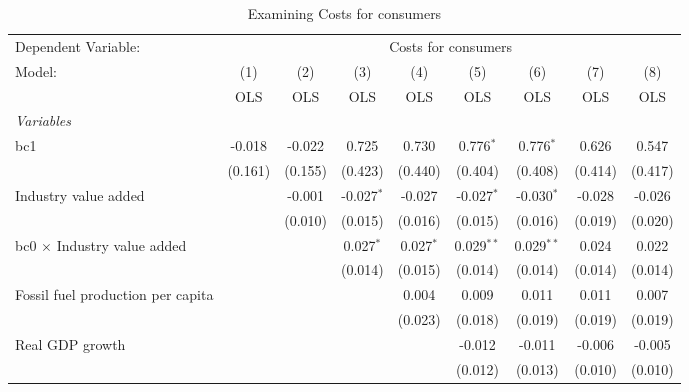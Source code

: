 
\begin{table}[htbp]
   \caption{Examining Costs for consumers}
   \centering
   \begin{tabular}{lcccccccc}
      \toprule
      Dependent Variable: & \multicolumn{8}{c}{Costs for consumers}\\
      Model:                                  & (1)     & (2)     & (3)          & (4)         & (5)          & (6)          & (7)     & (8)\\  
                                              &  OLS    & OLS     & OLS          & OLS         & OLS          & OLS          & OLS     & OLS\\  
      \midrule
      \emph{Variables}\\
      bc1                                     & -0.018  & -0.022  & 0.725        & 0.730       & 0.776$^{*}$  & 0.776$^{*}$  & 0.626   & 0.547\\   
                                              & (0.161) & (0.155) & (0.423)      & (0.440)     & (0.404)      & (0.408)      & (0.414) & (0.417)\\   
      Industry value added                    &         & -0.001  & -0.027$^{*}$ & -0.027      & -0.027$^{*}$ & -0.030$^{*}$ & -0.028  & -0.026\\   
                                              &         & (0.010) & (0.015)      & (0.016)     & (0.015)      & (0.016)      & (0.019) & (0.020)\\   
      bc0 $\times$ Industry value added       &         &         & 0.027$^{*}$  & 0.027$^{*}$ & 0.029$^{**}$ & 0.029$^{**}$ & 0.024   & 0.022\\   
                                              &         &         & (0.014)      & (0.015)     & (0.014)      & (0.014)      & (0.014) & (0.014)\\   
      Fossil fuel production per capita       &         &         &              & 0.004       & 0.009        & 0.011        & 0.011   & 0.007\\   
                                              &         &         &              & (0.023)     & (0.018)      & (0.019)      & (0.019) & (0.019)\\   
      Real GDP growth                         &         &         &              &             & -0.012       & -0.011       & -0.006  & -0.005\\   
                                              &         &         &              &             & (0.012)      & (0.013)      & (0.010) & (0.010)\\   

\end{tabular}
\end{table}
